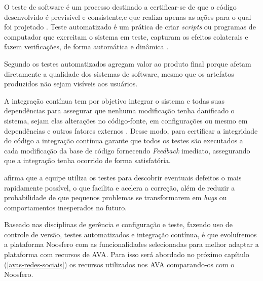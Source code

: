 O teste de software é um processo destinado a certificar-se de que o código desenvolvido é previsível e consistente,e que realiza apenas as ações para o qual foi projetado \cite{myers2011art}. Teste automatizado é um prática de criar \textit{scripts} ou programas de computador que exercitam o sistema em teste, capturam os efeitos colaterais e fazem verificações, de forma automática e dinâmica \cite{meszaros2007xunit}.

Segundo  os testes automatizados agregam valor ao produto final porque afetam diretamente a qualidade dos sistemas de software, mesmo que os artefatos produzidos não sejam visíveis aos usuários.

A integração contínua tem por objetivo integrar o sistema e todas suas dependências para assegurar que nenhuma modificação tenha danificado o sistema, sejam elas alterações no código-fonte, em configurações ou mesmo em dependências e outros fatores externos \cite{duvall2007continuous}. Desse modo, para certificar a integridade do código a integração contínua garante que todos os testes são executados a cada modificação da base de código fornecendo \textit{Feedback} imediato, assegurando que a integração tenha ocorrido de forma satisfatória.

 afirma que a equipe utiliza os testes para descobrir eventuais defeitos o mais rapidamente possível, o que facilita e acelera a correção, além de reduzir a probabilidade de que pequenos problemas se transformarem em \textit{bugs} ou comportamentos inesperados no futuro.



Baseado nas disciplinas de gerência e configuração e teste, fazendo uso de controle de versão, testes automatizados e integração contínua, é que evoluíremos a plataforma Noosfero com as funcionalidades selecionadas para melhor adaptar a plataforma com recursos de AVA. Para isso será abordado no próximo capítulo (\ref{avas-redes-sociais}) os recursos utilizados nos AVA comparando-os com o Noosfero.